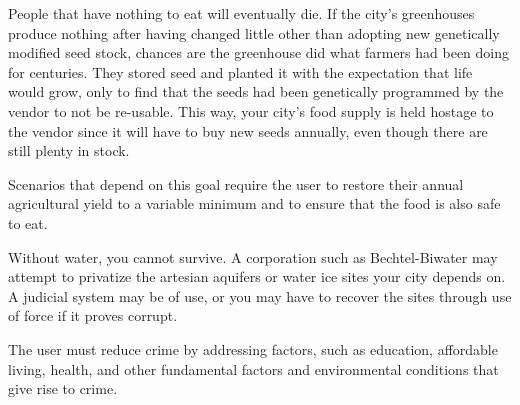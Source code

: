 
People that have nothing to eat will eventually die. If the city's greenhouses produce nothing after having changed little other than adopting new genetically modified seed stock, chances are the greenhouse did what farmers had been doing for centuries. They stored seed and planted it with the expectation that life would grow, only to find that the seeds had been genetically programmed by the vendor to not be re-usable. This way, your city's food supply is held hostage to the vendor since it will have to buy new seeds annually, even though there are still plenty in stock.

Scenarios that depend on this goal require the user to restore their annual agricultural yield to a variable minimum and to ensure that the food is also safe to eat.


Without water, you cannot survive. A corporation such as Bechtel-Biwater may attempt to privatize the artesian aquifers or water ice sites your city depends on. A judicial system may be of use, or you may have to recover the sites through use of force if it proves corrupt.


The user must reduce crime by addressing factors, such as education, affordable living, health, and other fundamental factors and environmental conditions that give rise to crime.

\stopitemize

